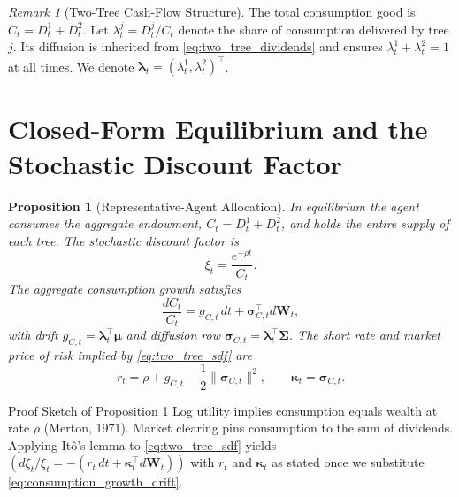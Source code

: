 \documentclass[11pt,letterpaper,oneside]{article}
\theoremstyle{plain}
\newtheorem{proposition}[theorem]{Proposition}
\theoremstyle{definition}
\theoremstyle{remark}
\newtheorem{remark}{Remark}[section]
\begin{document}
\begin{remark}[Two-Tree Cash-Flow Structure]
The total consumption good is $C_t = D^1_t + D^2_t$. Let $\lambda^j_t = D^j_t/C_t$ denote the share of consumption delivered by tree $j$. Its diffusion is inherited from \eqref{eq:two_tree_dividends} and ensures $\lambda^1_t + \lambda^2_t = 1$ at all times. We denote $\bm{\lambda}_t = (\lambda^1_t,\lambda^2_t)^\top$.
\end{remark}

\section{Closed-Form Equilibrium and the Stochastic Discount Factor}
\label{sec:two_tree_equilibrium}

\begin{proposition}[Representative-Agent Allocation]
\label{prop:log_allocation}
In equilibrium the agent consumes the aggregate endowment, $C_t = D^1_t + D^2_t$, and holds the entire supply of each tree. The stochastic discount factor is
\begin{equation}
\label{eq:two_tree_sdf}
  \xi_t = \frac{e^{-\rho t}}{C_t}.
\end{equation}
The aggregate consumption growth satisfies
\begin{equation}
\label{eq:consumption_growth_drift}
  \frac{dC_t}{C_t} = g_{C,t}\,dt + \bm{\sigma}_{C,t}^\top d\bm{W}_t,
\end{equation}
with drift $g_{C,t} = \bm{\lambda}_t^\top \bm{\mu}$ and diffusion row $\bm{\sigma}_{C,t} = \bm{\lambda}_t^\top \bm{\Sigma}$. The short rate and market price of risk implied by \eqref{eq:two_tree_sdf} are
\begin{equation}
\label{eq:two_tree_short_rate}
  r_t = \rho + g_{C,t} - \frac{1}{2} \| \bm{\sigma}_{C,t} \|^2,
\qquad
  \bm{\kappa}_t = \bm{\sigma}_{C,t}.
\end{equation}
\end{proposition}

\begin{leanproofbox}{Proof Sketch of Proposition \ref{prop:log_allocation}}
Log utility implies consumption equals wealth at rate $\rho$ (Merton, 1971). Market clearing pins consumption to the sum of dividends. Applying It\^o's lemma to \eqref{eq:two_tree_sdf} yields $(d\xi_t/\xi_t = -(r_t\,dt + \bm{\kappa}_t^\top d\bm{W}_t))$ with $r_t$ and $\bm{\kappa}_t$ as stated once we substitute \eqref{eq:consumption_growth_drift}.
\end{leanproofbox}
\end{document}
